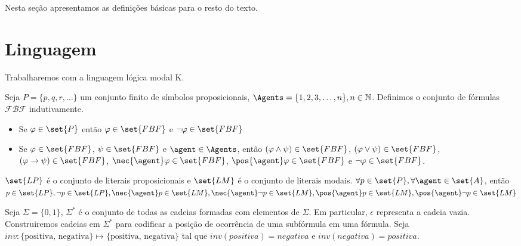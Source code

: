 	
Nesta seção apresentamos as definições básicas para o resto do texto.

\section{Linguagem}
Trabalharemos com a linguagem lógica modal K.

\begin{definition}
Seja $P = \{p, q, r, \dots\}$ um conjunto finito de símbolos proposicionais, $\Agents = \{1, 2, 3, \dots, n\}, n \in \mathbb{N}$. Definimos o conjunto de fórmulas $\mathcal{FBF}$ indutivamente.

\begin{itemize}
\item Se $\varphi \in \set{P}$ então $\varphi \in \set{FBF}$ e $\neg\varphi \in \set{FBF}$
\item Se $\varphi \in \set{FBF}$, $\psi \in \set{FBF}$ e $\agent \in \Agents$, então $(\varphi \land \psi) \in \set{FBF}$, $(\varphi \lor \psi) \in \set{FBF}$, $(\varphi \rightarrow \psi) \in \set{FBF}$, $\nec{\agent} \varphi \in \set{FBF}$, $\pos{\agent} \varphi \in \set{FBF}$ e $\neg\varphi \in \set{FBF}$.
\end{itemize}
\end{definition}

\begin{definition}
$\set{LP}$ é o conjunto de literais proposicionais e $\set{LM}$ é o conjunto de literais modais.
$\forall p \in \set{P}, \forall \agent \in \set{A}$, então $ p \in \set{LP}, \neg p \in \set{LP}, \nec{\agent} p \in \set{LM}, \nec{\agent} \neg p \in \set{LM}, \pos{\agent} p \in \set{LM}, \pos{\agent} \neg p \in \set{LM}$
\end{definition}

Seja $\Sigma = \{0, 1\}$, $\Sigma^*$ é o conjunto de todas as cadeias formadas com elementos de $\Sigma$. Em particular, $\epsilon$ representa a cadeia vazia. Construiremos cadeias em $\Sigma^*$ para codificar a posição de ocorrência de uma subfórmula em uma fórmula. Seja $inv \colon \{\text{positiva, negativa}\} \mapsto \{\text{positiva, negativa}\}$ tal que $inv(positiva) = negativa$ e $inv(negativa) = positiva$.

